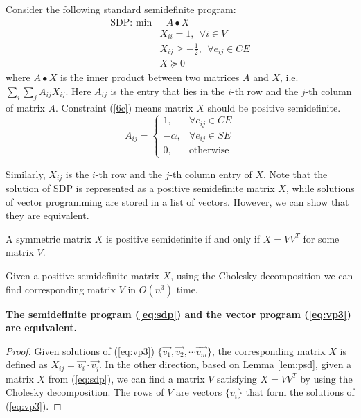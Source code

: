 \documentclass[10pt,conference]{IEEEtran}
\begin{document}
Consider the following standard semidefinite program:
\begin{align}
	\label{eq:sdp}
	\textrm{SDP:\ \ min}	& \ \ \ A \bullet X						\\
				& X_{ii} = 1, \ \ \forall i \in V						\tag{$6a$}\\
				& X_{ij} \ge -\frac{1}{2}, \ \ \forall e_{ij} \in CE		\tag{$6b$}\\
				& X \succeq 0									\label{6c}\tag{$6c$}
\end{align}
where $A \bullet X$ is the inner product between two matrices $A$ and $X$, i.e. $\sum_i \sum_j A_{ij}X_{ij}$.
Here $A_{ij}$ is the entry that lies in the $i$-th row and the $j$-th column of matrix $A$.
Constraint (\ref{6c}) means matrix $X$ should be positive semidefinite.
\begin{equation}
	A_{ij} = 
	\left\{
	\begin{array}{cc}
		1, 			& \forall e_{ij} \in CE\\
		-\alpha, 		& \forall e_{ij} \in SE\\
		0,			& \textrm{otherwise}
	\end{array}
	\right.
\end{equation}

Similarly, $X_{ij}$ is the $i$-th row and the $j$-th column entry of $X$.
Note that the solution of SDP is represented as a positive semidefinite matrix $X$, while solutions of vector programming are stored in a list of vectors.
However, we can show that they are equivalent.

\begin{lemma}
\label{lem:psd}
A symmetric matrix $X$ is positive semidefinite if and only if $X = VV^T$ for some matrix $V$. 
\end{lemma}

Given a positive semidefinite matrix $X$, using the Cholesky decomposition we can find corresponding matrix $V$ in $O(n^3)$ time.

\begin{theorem}
\textbf{The semidefinite program (\ref{eq:sdp}) and the vector program (\ref{eq:vp3}) are equivalent.}
\end{theorem}
\begin{proof}
Given solutions of (\ref{eq:vp3}) $\{\vec{v_1}, \vec{v_2}, \cdots \vec{v_m}\}$, the corresponding matrix $X$ is defined as $X_{ij}=\vec{v_i} \cdot \vec{v_j}$.
In the other direction, based on Lemma \ref{lem:psd}, given a matrix $X$ from (\ref{eq:sdp}),  we can find a matrix $V$ satisfying $X=VV^T$ by using the Cholesky decomposition.
The rows of $V$ are vectors $\{v_i\}$ that form the solutions of (\ref{eq:vp3}).
\end{proof}
\end{document}
